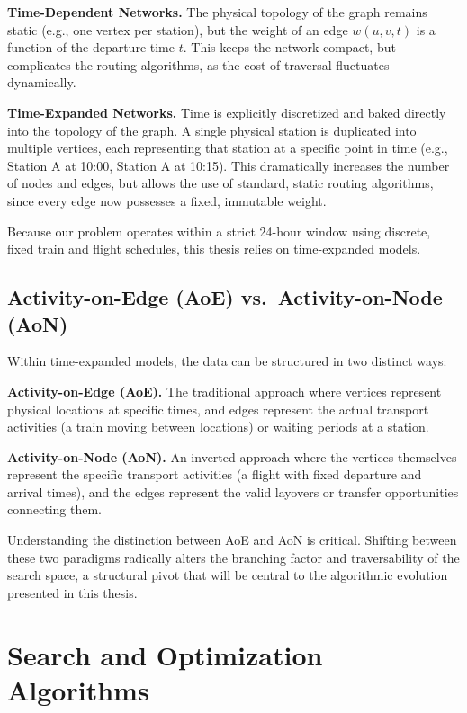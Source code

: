 \textbf{Time-Dependent Networks.}
The physical topology of the graph remains static (e.g., one vertex per station), but the weight of an edge $w(u, v, t)$ is a function of the departure time $t$. This keeps the network compact, but complicates the routing algorithms, as the cost of traversal fluctuates dynamically.

\textbf{Time-Expanded Networks.}
Time is explicitly discretized and baked directly into the topology of the graph. A single physical station is duplicated into multiple vertices, each representing that station at a specific point in time (e.g., Station A at 10:00, Station A at 10:15). This dramatically increases the number of nodes and edges, but allows the use of standard, static routing algorithms, since every edge now possesses a fixed, immutable weight.

\medskip

Because our problem operates within a strict 24-hour window using discrete, fixed train and flight schedules, this thesis relies on time-expanded models.

\subsection{Activity-on-Edge (AoE) vs.\ Activity-on-Node (AoN)}
\label{subsec:aoe_aon}

Within time-expanded models, the data can be structured in two distinct ways:

\medskip

\textbf{Activity-on-Edge (AoE).}
The traditional approach where vertices represent physical locations at specific times, and edges represent the actual transport activities (a train moving between locations) or waiting periods at a station.

\textbf{Activity-on-Node (AoN).}
An inverted approach where the vertices themselves represent the specific transport activities (a flight with fixed departure and arrival times), and the edges represent the valid layovers or transfer opportunities connecting them.

\medskip

Understanding the distinction between AoE and AoN is critical. Shifting between these two paradigms radically alters the branching factor and traversability of the search space, a structural pivot that will be central to the algorithmic evolution presented in this thesis.

\section{Search and Optimization Algorithms}
\label{sec:search_algorithms}

